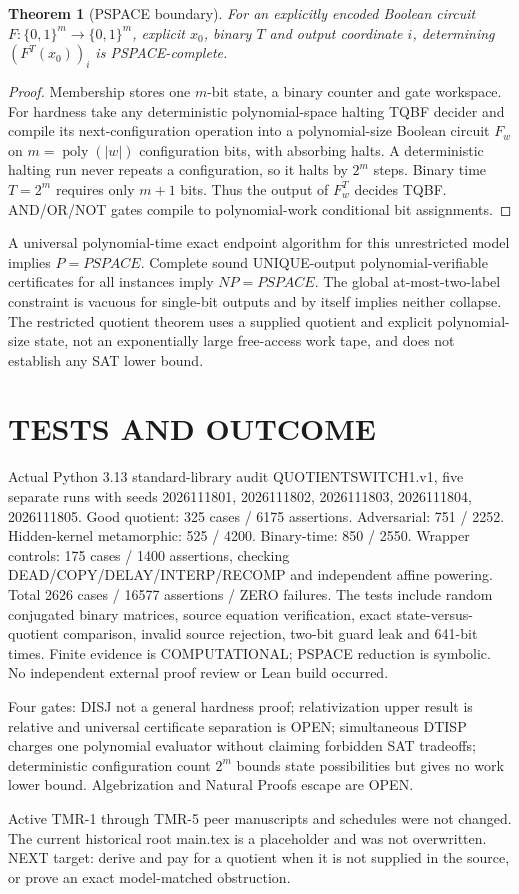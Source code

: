 \documentclass[11pt]{article}
\newtheorem{theorem}{Theorem}
\begin{document}
\begin{theorem}[PSPACE boundary]
For an explicitly encoded Boolean circuit $F:\{0,1\}^m\to\{0,1\}^m$, explicit $x_0$, binary $T$ and output coordinate $i$, determining $(F^T(x_0))_i$ is PSPACE-complete.
\end{theorem}
\begin{proof}
Membership stores one $m$-bit state, a binary counter and gate workspace. For hardness take any deterministic polynomial-space halting TQBF decider and compile its next-configuration operation into a polynomial-size Boolean circuit $F_w$ on $m=\operatorname{poly}(|w|)$ configuration bits, with absorbing halts. A deterministic halting run never repeats a configuration, so it halts by $2^m$ steps. Binary time $T=2^m$ requires only $m+1$ bits. Thus the output of $F_w^T$ decides TQBF. AND/OR/NOT gates compile to polynomial-work conditional bit assignments.
\end{proof}
A universal polynomial-time exact endpoint algorithm for this unrestricted model implies $P=PSPACE$. Complete sound UNIQUE-output polynomial-verifiable certificates for all instances imply $NP=PSPACE$. The global at-most-two-label constraint is vacuous for single-bit outputs and by itself implies neither collapse. The restricted quotient theorem uses a supplied quotient and explicit polynomial-size state, not an exponentially large free-access work tape, and does not establish any SAT lower bound.

\section{TESTS AND OUTCOME}
Actual Python 3.13 standard-library audit QUOTIENTSWITCH1.v1, five separate runs with seeds 2026111801, 2026111802, 2026111803, 2026111804, 2026111805. Good quotient: 325 cases / 6175 assertions. Adversarial: 751 / 2252. Hidden-kernel metamorphic: 525 / 4200. Binary-time: 850 / 2550. Wrapper controls: 175 cases / 1400 assertions, checking DEAD/COPY/DELAY/INTERP/RECOMP and independent affine powering. Total 2626 cases / 16577 assertions / ZERO failures. The tests include random conjugated binary matrices, source equation verification, exact state-versus-quotient comparison, invalid source rejection, two-bit guard leak and 641-bit times. Finite evidence is COMPUTATIONAL; PSPACE reduction is symbolic. No independent external proof review or Lean build occurred.

Four gates: DISJ not a general hardness proof; relativization upper result is relative and universal certificate separation is OPEN; simultaneous DTISP charges one polynomial evaluator without claiming forbidden SAT tradeoffs; deterministic configuration count $2^m$ bounds state possibilities but gives no work lower bound. Algebrization and Natural Proofs escape are OPEN.

Active TMR-1 through TMR-5 peer manuscripts and schedules were not changed. The current historical root main.tex is a placeholder and was not overwritten. NEXT target: derive and pay for a quotient when it is not supplied in the source, or prove an exact model-matched obstruction.
\end{document}
